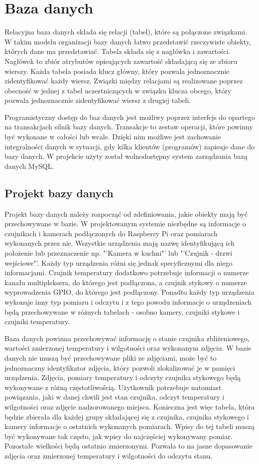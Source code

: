 \documentclass[a4paper,12pt,twoside]{article}
\begin{document}
\section{Baza danych}
Relacyjna baza danych składa się relacji (tabel), które są połączone związkami. W takim modelu organizacji bazy danych łatwo przedstawić rzeczywiste obiekty, których dane ma przedstawiać. Tabela składa się z nagłówka i zawartości. Nagłówek to zbiór atrybutów opisujących zawartość składającą się ze zbioru wierszy. Każda tabela posiada klucz główny, który pozwala jednoznacznie zidentyfikować każdy wiersz. Związki między relacjami są realizowane poprzez obecność w jednej z tabel uczestniczących w związku klucza obcego, który pozwala jednoznacznie zidentyfikować wiersz z drugiej tabeli.

Programistyczny dostęp do baz danych jest możliwy poprzez interfejs do opartego na transakcjach silnik bazy danych. Transakcje to zestaw operacji, które powinny być wykonane w całości lub wcale. Dzięki nim możliwe jest zachowanie integralności danych w sytuacji, gdy kilka klientów (programów) zapisuje dane do bazy danych. W projekcie użyty został wolnodostępny system zarządzania bazą danych MySQL.
\subsection{Projekt bazy danych}
Projekt bazy danych należy rozpocząć od zdefiniowania, jakie obiekty mają być przechowywane w bazie. W projektowanym systemie niezbędne są informacje o czujnikach i kamerach podłączonych do Raspberry Pi oraz pomiarach wykonanych przez nie. Wszystkie urządzenia mają nazwę identyfikującą ich położenie lub przeznaczenie np. "'Kamera w kuchni"' lub "'Czujnik - drzwi wejściowe"'. Każdy typ urządzenia różni się jednak specyficznymi dla niego informacjami. Czujnik temperatury dodatkowo potrzebuje informacji o numerze kanału multipleksera, do którego jest podłączona, a czujnik stykowy o numerze wyprowadzenia GPIO, do którego jest podłączony. Ponadto każdy typ urządzenia wykonuje inny typ pomiaru i odczytu i z tego powodu informacje o urządzeniach będą przechowywane w różnych tabelach - osobno kamery, czujniki stykowe i czujniki temperatury.

Baza danych powinna przechowywać informację o stanie czujnika zbliżeniowego, wartości zmierzonej temperatury i wilgotności oraz wykonanym zdjęciu. W bazie danych nie muszą być przechowywane pliki ze zdjęciami, może być to jednoznaczny identyfikator zdjęcia, który pozwoli zlokalizować je w pamięci urządzenia. Zdjęcia, pomiary temperatury i odczyty czujnika stykowego będą wykonywane z różną częstotliwością. Użytkownik potrzebuje natomiast powiązania, jaki w danej chwili jest stan czujnika, odczyt temperatury i wilgotności oraz zdjęcie nadzorowanego miejsca. Konieczna jest więc tabela, która będzie zbierała dla każdej grupy składającej się z czujnika, czujnika stykowego i kamery informacje o ostatnich wykonanych pomiarach. Wpisy do tej tabeli muszą być wykonywane tak często, jak wpisy do najczęściej wykonywany pomiar. Pozostałe wielkości będą ostatnio zmierzonymi. Pozwala to na jasne dopasowanie zdjęcia oraz zmierzonej temperatury i wilgotności do odczytu stanu.
\end{document}
